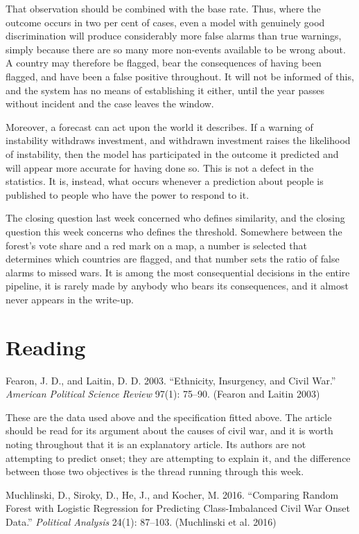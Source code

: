 \documentclass[
  a4paper,
]{scrbook}
\begin{document}
That observation should be combined with the base rate. Thus, where the
outcome occurs in two per cent of cases, even a model with genuinely
good discrimination will produce considerably more false alarms than
true warnings, simply because there are so many more non-events
available to be wrong about. A country may therefore be flagged, bear
the consequences of having been flagged, and have been a false positive
throughout. It will not be informed of this, and the system has no means
of establishing it either, until the year passes without incident and
the case leaves the window.

Moreover, a forecast can act upon the world it describes. If a warning
of instability withdraws investment, and withdrawn investment raises the
likelihood of instability, then the model has participated in the
outcome it predicted and will appear more accurate for having done so.
This is not a defect in the statistics. It is, instead, what occurs
whenever a prediction about people is published to people who have the
power to respond to it.

The closing question last week concerned who defines similarity, and the
closing question this week concerns who defines the threshold. Somewhere
between the forest's vote share and a red mark on a map, a number is
selected that determines which countries are flagged, and that number
sets the ratio of false alarms to missed wars. It is among the most
consequential decisions in the entire pipeline, it is rarely made by
anybody who bears its consequences, and it almost never appears in the
write-up.

\section{Reading}\label{reading-2}

Fearon, J. D., and Laitin, D. D. 2003. ``Ethnicity, Insurgency, and
Civil War.'' \emph{American Political Science Review} 97(1): 75--90.
(Fearon and Laitin 2003)

These are the data used above and the specification fitted above. The
article should be read for its argument about the causes of civil war,
and it is worth noting throughout that it is an explanatory article. Its
authors are not attempting to predict onset; they are attempting to
explain it, and the difference between those two objectives is the
thread running through this week.

Muchlinski, D., Siroky, D., He, J., and Kocher, M. 2016. ``Comparing
Random Forest with Logistic Regression for Predicting Class-Imbalanced
Civil War Onset Data.'' \emph{Political Analysis} 24(1): 87--103.
(Muchlinski et al. 2016)
\end{document}
